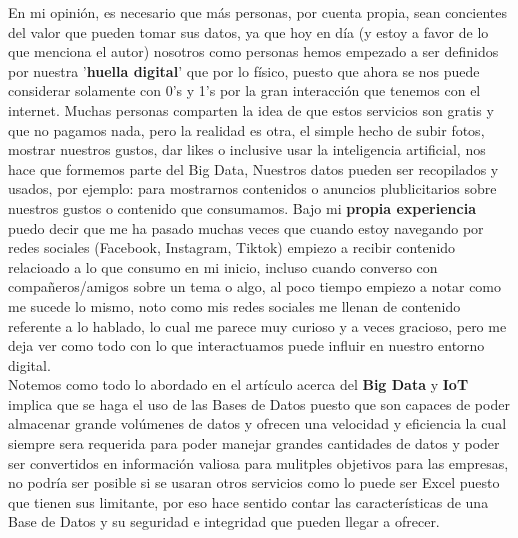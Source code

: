 \documentclass[12pt]{report}
\begin{document}
\begin{enumerate}[label=\textbf{\arabic*.}, leftmargin=*]
\begin{enumerate}[label=\textbf{\alph*.}, leftmargin=*, itemsep=1.0em]
En mi opinión, es necesario que más personas, por cuenta propia, sean concientes del valor que pueden tomar sus datos, ya que hoy en día (y estoy a favor de lo que menciona el autor) nosotros como personas hemos empezado a ser definidos por nuestra '\textbf{huella digital}' que por lo físico, puesto que ahora se nos puede considerar solamente con 0's y 1's por la gran interacción que tenemos con el internet. Muchas personas comparten la idea de que estos servicios son gratis y que no pagamos nada, pero la realidad es otra, el simple hecho de subir fotos, mostrar nuestros gustos, dar likes o inclusive usar la inteligencia artificial, nos hace que formemos parte del Big Data, Nuestros datos pueden ser recopilados y usados, por ejemplo: para mostrarnos contenidos o anuncios plublicitarios sobre nuestros gustos o contenido que consumamos. Bajo mi \textbf{propia experiencia} puedo decir que me ha pasado muchas veces que cuando estoy navegando por redes sociales (Facebook, Instagram, Tiktok) empiezo a recibir contenido relacioado a lo que consumo en mi inicio, incluso cuando converso con compañeros/amigos sobre un tema o algo, al poco tiempo empiezo a notar como me sucede lo mismo, noto como mis redes sociales me llenan de contenido referente a lo hablado, lo cual me parece muy curioso y a veces gracioso, pero me deja ver como todo con lo que interactuamos puede influir en nuestro entorno digital. \\

Notemos como todo lo abordado en el artículo acerca del \textbf{Big Data} y \textbf{IoT} implica que se haga el uso de las Bases de Datos puesto que son capaces de poder almacenar grande volúmenes de datos y ofrecen una velocidad y eficiencia la cual siempre sera requerida para poder manejar grandes cantidades de datos y poder ser convertidos en información valiosa para mulitples objetivos para las empresas, no podría ser posible si se usaran otros servicios como lo puede ser Excel puesto que tienen sus limitante, por eso hace sentido contar las características de una Base de Datos y su seguridad e integridad que pueden llegar a ofrecer. \\


\end{enumerate}
\end{enumerate}
\end{document}

